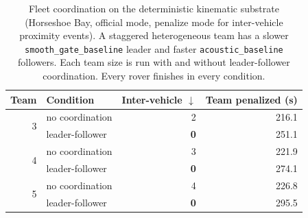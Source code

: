 \begin{table}[t]
\centering
\caption{Fleet coordination on the deterministic kinematic substrate (Horseshoe Bay, official mode, penalize mode for inter-vehicle proximity events). A staggered heterogeneous team has a slower \texttt{smooth\_gate\_baseline} leader and faster \texttt{acoustic\_baseline} followers. Each team size is run with and without leader-follower coordination. Every rover finishes in every condition.}
\label{tab:coordination}
\footnotesize
\setlength{\tabcolsep}{5pt}
\renewcommand{\arraystretch}{1.15}
\begin{tabular}{rlrr}
\toprule
Team & Condition & Inter-vehicle $\downarrow$ & Team penalized (s) \\
\midrule
\multirow{2}{*}{3} & no coordination & 2 & 216.1 \\
 & leader-follower & \textbf{0} & 251.1 \\
\midrule
\multirow{2}{*}{4} & no coordination & 3 & 221.9 \\
 & leader-follower & \textbf{0} & 274.1 \\
\midrule
\multirow{2}{*}{5} & no coordination & 4 & 226.8 \\
 & leader-follower & \textbf{0} & 295.5 \\
\bottomrule
\end{tabular}
\end{table}
